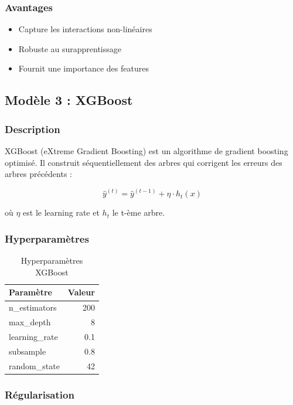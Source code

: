 \documentclass[12pt,a4paper]{article}
\begin{document}
\subsubsection{Avantages}

\begin{itemize}
    \item Capture les interactions non-linéaires
    \item Robuste au surapprentissage
    \item Fournit une importance des features
\end{itemize}

\subsection{Modèle 3 : XGBoost}

\subsubsection{Description}

XGBoost (eXtreme Gradient Boosting) est un algorithme de gradient boosting optimisé. Il construit séquentiellement des arbres qui corrigent les erreurs des arbres précédents :

\begin{equation}
\hat{y}^{(t)} = \hat{y}^{(t-1)} + \eta \cdot h_t(x)
\end{equation}

où $\eta$ est le learning rate et $h_t$ le t-ème arbre.

\subsubsection{Hyperparamètres}

\begin{table}[H]
\centering
\caption{Hyperparamètres XGBoost}
\begin{tabular}{lr}
\toprule
\textbf{Paramètre} & \textbf{Valeur} \\
\midrule
n\_estimators & 200 \\
max\_depth & 8 \\
learning\_rate & 0.1 \\
subsample & 0.8 \\
random\_state & 42 \\
\bottomrule
\end{tabular}
\end{table}

\subsubsection{Régularisation}
\end{document}

